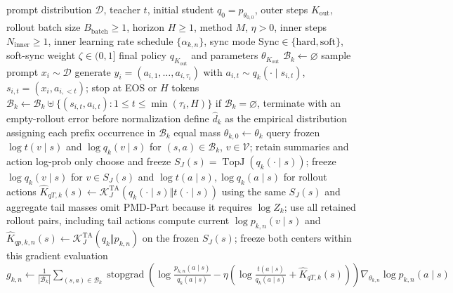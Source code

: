 \documentclass[lang=cn,scheme=chinese,openany]{../book/elegantbook}
\newcommand{\sg}{\operatorname{stopgrad}}
\begin{document}
\begin{algorithm}[ht]
\caption{Tail-aware OPD outer--inner optimization\\{\small\textit{Semantics: 冻结 outer rollout，以 Tail-aware KL 中心运行 Mean、BPO 或 MDPO，再同步并重新 rollout}}}
\begin{algorithmic}[1]
\Require prompt distribution $\mathcal D$, teacher $t$, initial student $q_0=p_{\theta_{0,0}}$, outer steps $K_{\mathrm{out}}$, rollout batch size $B_{\mathrm{batch}}\ge1$, horizon $H\ge1$, method $M$, $\eta>0$, inner steps $N_{\mathrm{inner}}\ge1$, inner learning rate schedule $\{\alpha_{k,n}\}$, sync mode $\mathrm{Sync}\in\{\mathrm{hard},\mathrm{soft}\}$, soft-sync weight $\zeta\in(0,1]$
\Ensure final policy $q_{K_{\mathrm{out}}}$ and parameters $\theta_{K_{\mathrm{out}}}$
    \State $\mathcal B_k\gets\varnothing$ 
        \State sample prompt $x_i\sim\mathcal D$
        \State generate $y_i=(a_{i,1},\ldots,a_{i,\tau_i})$ with $a_{i,t}\sim q_k(\cdot\mid s_{i,t})$, $s_{i,t}=(x_i,a_{i,<t})$; stop at EOS or $H$ tokens
        \State $\mathcal B_k\gets\mathcal B_k\mathbin{\uplus}\{(s_{i,t},a_{i,t}):1\le t\le\min(\tau_i,H)\}$
    \EndFor
    \State if $\mathcal B_k=\varnothing$, terminate with an empty-rollout error before normalization
    \State define $\widehat d_k$ as the empirical distribution assigning each prefix occurrence in $\mathcal B_k$ equal mass
    \State $\theta_{k,0}\gets\theta_k$ 
    \State query frozen $\log t(v\mid s)$ and $\log q_k(v\mid s)$ for $(s,a)\in\mathcal B_k$, $v\in\mathcal V$; retain summaries and action log-prob only
    \State choose and freeze $S_J(s)=\operatorname{TopJ}(q_k(\cdot\mid s))$; freeze $\log q_k(v\mid s)$ for $v\in S_J(s)$ and $\log t(a\mid s),\log q_k(a\mid s)$ for rollout actions
    \State $\widehat K_{qT,k}(s)\gets\mathcal K_J^{\mathrm{TA}}(q_k(\cdot\mid s)\Vert t(\cdot\mid s))$ using the same $S_J(s)$ and aggregate tail masses
    \State omit PMD-Part because it requires $\log Z_k$; use all retained rollout pairs, including tail actions
        \State compute current $\log p_{k,n}(v\mid s)$ and $\widehat K_{qp,k,n}(s)\gets\mathcal K_J^{\mathrm{TA}}(q_k\Vert p_{k,n})$ on the frozen $S_J(s)$; freeze both centers within this gradient evaluation
            \State $g_{k,n}\gets\frac1{|\mathcal B_k|}\sum_{(s,a)\in\mathcal B_k}\sg\!\left(\log\frac{p_{k,n}(a\mid s)}{q_k(a\mid s)}-\eta\left(\log\frac{t(a\mid s)}{q_k(a\mid s)}+\widehat K_{qT,k}(s)\right)\right)\nabla_{\theta_{k,n}}\log p_{k,n}(a\mid s)$

\end{algorithmic}
\end{algorithm}
\end{document}
